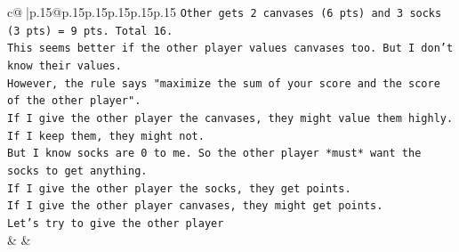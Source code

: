 \documentclass{article}
\begin{document}
{\begin{supertabular}{c@{$\;$}|p{.15\linewidth}@{}p{.15\linewidth}p{.15\linewidth}p{.15\linewidth}p{.15\linewidth}p{.15\linewidth}}
{{{\texttt{Other gets 2 canvases (6 pts) and 3 socks (3 pts) = 9 pts. Total 16.} \\
\texttt{This seems better if the other player values canvases too. But I don't know their values.} \\
\texttt{However, the rule says "maximize the sum of your score and the score of the other player".} \\
\texttt{If I give the other player the canvases, they might value them highly. If I keep them, they might not.} \\
\texttt{But I know socks are 0 to me. So the other player *must* want the socks to get anything.} \\
\texttt{If I give the other player the socks, they get points.} \\
\texttt{If I give the other player canvases, they might get points.} \\
\texttt{Let's try to give the other player} \\
            }
        }
    }
    & & \\ \\


\end{supertabular}}
\end{document}
